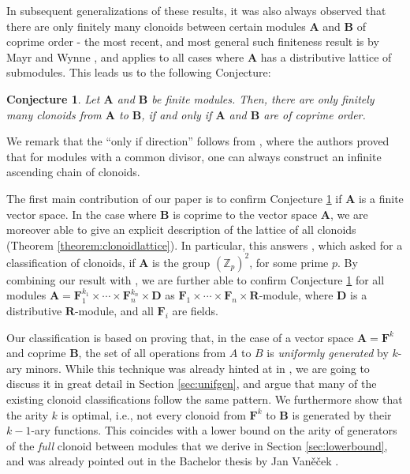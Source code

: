 \documentclass[11pt]{amsart}
\theoremstyle{plain}
\newtheorem{conjecture}[thm]{Conjecture}
\theoremstyle{definition}
\newcommand{\Z}{{\mathbb Z}}
\newcommand{\F}{{\mathbf F}}
\newcommand{\alg}[1]{\mathbf{#1}}
\newcommand{\algA}{\alg{A}}
\newcommand{\algB}{\alg{B}}
\newcommand{\algR}{\alg{R}}
\begin{document}
In subsequent generalizations of these results, it was also always observed that there are only finitely many clonoids between certain modules $\algA$ and $\algB$ of coprime order - the most recent, and most general such finiteness result is by Mayr and Wynne \cite{MW-clonoidsmodules}, and applies to all cases where $\algA$ has a distributive lattice of submodules. This leads us to the following Conjecture:

\begin{conjecture} \label{conjecture:main}
Let $\algA$ and $\algB$ be finite modules. Then, there are only finitely many clonoids from $\algA$ to $\algB$, if and only if $\algA$ and $\algB$ are of coprime order.
\end{conjecture}

We remark that the ``only if direction'' follows from \cite[Theorem $1.3$]{MW-clonoidsmodules}, where the authors proved that for modules with a common divisor, one can always construct an infinite ascending chain of clonoids.

 The first main contribution of our paper is to confirm Conjecture \ref{conjecture:main} if $\algA$ is a finite vector space. In the case where $\algB$ is coprime to the vector space $\algA$, we are moreover able to give an explicit description of the lattice of all clonoids (Theorem \ref{theorem:clonoidlattice}). In particular, this answers \cite[Question 1.2]{MW-clonoidsmodules}, which asked for a classification of clonoids, if $\algA$ is the group $(\Z_p)^2$, for some prime $p$. By combining our result with \cite{MW-clonoidsmodules}, we are further able to confirm Conjecture \ref{conjecture:main} for all modules $\algA =\F_1^{k_1}\times \cdots \times \F_n^{k_n} \times \alg D$ as $\F_1\times \cdots \times\F_n \times \algR$-module, where $\alg D$ is a distributive $\algR$-module, and all $\F_i$ are fields.

Our classification is based on proving that, in the case of a vector space $\algA = \F^k$ and coprime $\algB$, the set of all operations from $A$ to $B$ is \emph{uniformly generated} by $k$-ary minors. While this technique was already hinted at in \cite{MW-clonoidsmodules}, we are going to discuss it in great detail in Section \ref{sec:unifgen}, and argue that many of the existing clonoid classifications follow the same pattern. We furthermore show that the arity $k$ is optimal, i.e., not every clonoid from $\F^k$ to $\algB$ is generated by their $k-1$-ary functions. This coincides with a lower bound on the arity of generators of the \emph{full} clonoid between modules that we derive in Section \ref{sec:lowerbound}, and was already pointed out in the Bachelor thesis by Jan Van\v{e}\v{c}ek \cite{vanecek-thesis}.
\end{document}
